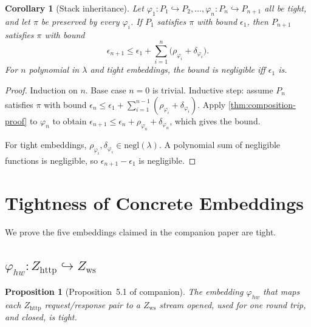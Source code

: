 \documentclass[11pt]{article}
\newtheorem{proposition}[theorem]{Proposition}
\newtheorem{corollary}[theorem]{Corollary}
\theoremstyle{definition}
\theoremstyle{remark}
\newcommand{\Zh}{Z_{\mathrm{http}}}
\newcommand{\Zw}{Z_{\mathrm{ws}}}
\begin{document}
\begin{corollary}[Stack inheritance]
\label{cor:stack-proof}
Let $\varphi_1 : P_1 \hookrightarrow P_2, \ldots, \varphi_n :
P_n \hookrightarrow P_{n+1}$ all be tight, and let $\pi$ be
preserved by every $\varphi_i$. If $P_1$ satisfies $\pi$ with bound
$\epsilon_1$, then $P_{n+1}$ satisfies $\pi$ with bound
\[
\epsilon_{n+1} \le \epsilon_1 + \sum_{i=1}^n
\bigl(\rho_{\varphi_i} + \delta_{\varphi_i}\bigr).
\]
For $n$ polynomial in $\lambda$ and tight embeddings, the bound is
negligible iff $\epsilon_1$ is.
\end{corollary}

\begin{proof}
Induction on $n$.
Base case $n = 0$ is trivial.
Inductive step: assume $P_n$ satisfies $\pi$ with bound
$\epsilon_n \le \epsilon_1 + \sum_{i=1}^{n-1}(\rho_{\varphi_i} +
\delta_{\varphi_i})$. Apply \cref{thm:composition-proof} to
$\varphi_n$ to obtain $\epsilon_{n+1} \le \epsilon_n +
\rho_{\varphi_n} + \delta_{\varphi_n}$, which gives the bound.

For tight embeddings, $\rho_{\varphi_i}, \delta_{\varphi_i} \in
\mathrm{negl}(\lambda)$. A polynomial sum of negligible functions
is negligible, so $\epsilon_{n+1} - \epsilon_1$ is negligible.
\end{proof}

\section{Tightness of Concrete Embeddings}
\label{sec:concrete-proofs}

We prove the five embeddings claimed in the companion paper are
tight.

\subsection{$\varphi_{hw} : \Zh \hookrightarrow \Zw$}

\begin{proposition}[Proposition~5.1 of companion]
\label{prop:hw-proof}
The embedding $\varphi_{hw}$ that maps each $\Zh$ request/response
pair to a $\Zw$ stream opened, used for one round trip, and closed,
is tight.
\end{proposition}
\end{document}
